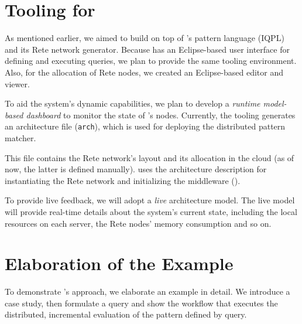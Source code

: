\section{Tooling for \iqd{}}

As mentioned earlier, 
we aimed to build \iqd{} on top of \eiq{}'s pattern language (IQPL) and its Rete network generator.
Because \eiq{} has an Eclipse-based user interface for defining and executing queries, we plan to provide the same tooling environment. Also, for the allocation of Rete nodes, we created an Eclipse-based editor and viewer.


To aid the system's dynamic capabilities, we plan to develop a \emph{runtime model-based dashboard} to monitor the state of \iqd{}'s nodes. Currently, the \iqd{} tooling generates an architecture file (\texttt{arch}), which is used for deploying the distributed pattern matcher.

This file contains the Rete network's layout and its allocation in the cloud (as of now, the latter is defined manually). \iqd{} uses the architecture description for instantiating the Rete network and initializing the middleware ().


To provide live feedback, we will adopt a \emph{live} architecture model. The live model will provide real-time details about the system's current state, including the local resources on each server, the Rete nodes' memory consumption and so on.




\section{Elaboration of the Example}
\label{overview-elaboration}

To demonstrate \iqd{}'s approach, we elaborate an example in detail. We introduce a case study, then formulate a query and show the workflow that executes the distributed, incremental evaluation of the pattern defined by query.

